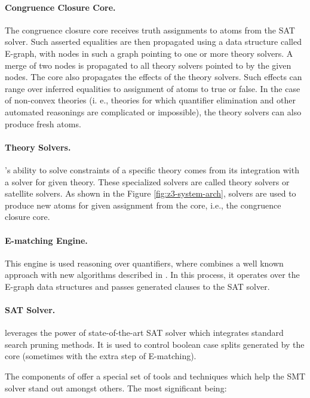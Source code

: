 \paragraph{Congruence Closure Core.}
The congruence closure core receives truth assignments to atoms from the SAT solver.
Such asserted equalities are then propagated using a data structure called E-graph, with nodes in such a graph pointing to one or more theory solvers.
A merge of two nodes is propagated to all theory solvers pointed to by the given nodes.
The core also propagates the effects of the theory solvers.
Such effects can range over inferred equalities to assignment of atoms to true or false.
In the case of non-convex theories (i. e., theories for which quantifier elimination and other automated reasonings are complicated or impossible), the theory solvers can also produce fresh atoms.

\paragraph{Theory Solvers.}
\ziii’s ability to solve constraints of a specific theory comes from its integration with a solver for given theory.
These specialized solvers are called theory solvers or satellite solvers.
As shown in the Figure \ref{fig:z3-system-arch}, solvers are used to produce new atoms for given assignment from the \ziii core, i.e., the congruence closure core.

\paragraph{E-matching Engine.}
This engine is used reasoning over quantifiers, where \ziii combines a well known approach with new algorithms described in \cite{z3:e-match}.
In this process, it operates over the E-graph data structures and passes generated clauses to the SAT solver.

\paragraph{SAT Solver.}
\ziii leverages the power of state-of-the-art SAT solver which integrates standard search pruning methods.
It is used to control boolean case splits generated by the \ziii core (sometimes with the extra step of E-matching).

\gap

The components of \ziii offer a special set of tools and techniques which help the SMT
solver stand out amongst others. The most significant being:

